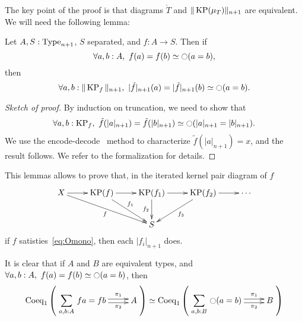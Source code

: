 The key point of the proof is that diagrams $\mathring T$ and $\|\operatorname{KP}(\mu_T)\|_{n+1}$
are equivalent.
We will need the following lemma:

\begin{lem}
\label{lem:Omono}
  Let $A,S:\operatorname{Type}_{n+1}$, $S$ separated, and $f:A \to S$. Then if 
  \begin{equation}
    \label{eq:Omono}
    \forall a,b:A,~f (a) = f (b) \simeq \ocircle (a=b),
  \end{equation}
  then
  \[\forall a,b:\|\operatorname{KP}_f\|_{n+1},~|\tilde f|_{n+1} (a) = |\tilde f|_{n+1} (b) \simeq \ocircle (a=b).\]
\end{lem}

\begin{proof}[Sketch of proof]
  By induction on truncation, we need to show that 
  \[\forall a,b:\operatorname{KP}_f,~\tilde f (|a|_{n+1}) = \tilde f (|b|_{n+1} )\simeq
  \ocircle (|a|_{n+1}=|b|_{n+1}).\]%
  We use the encode-decode~\cite[Section 8.9]{hottbook} method to characterize $\tilde f (|a|_{n+1})
  = x$, and the result follows. We refer to the formalization for details.
\end{proof}

This lemmas allows to prove that, in the iterated kernel pair diagram
of $f$
\[
  \xymatrix{
    X \ar[r] \ar[rrd]_f & \KP(f) \ar[r] \ar[rd]^{f_1} & \KP(f_1)
    \ar[r] \ar[d]_{f_2} & \KP(f_2) \ar[r] \ar[ld]^{f_3}& \cdots \\
    && S &&
  }
\]
if $f$ satisties~\ref{eq:Omono}, then each $|f_i|_{n+1}$ does.

\begin{rmq}
It is clear that if $A$ and $B$ are equivalent types, and $\forall a,b:A,~f (a) = f (b) \simeq \ocircle
(a=b)$, then 
\[
    \mathrm{Coeq}_1 \left( 
      \xymatrix{
        \displaystyle{\sumD {a,b} A {f a = f b}} \ar@<-.5ex>[r]_-{\pi_2} \ar@<.5ex>[r]^-{\pi_1} & A
      }
    \right)
    \simeq \mathrm{Coeq}_1 \left( 
      \xymatrix{\displaystyle{\sumD {a,b} B {\modal (a=b)}} \ar@<-.5ex>[r]_-{\pi_2} \ar@<.5ex>[r]^-{\pi_1} & B}
    \right)
  \]
\end{rmq}

